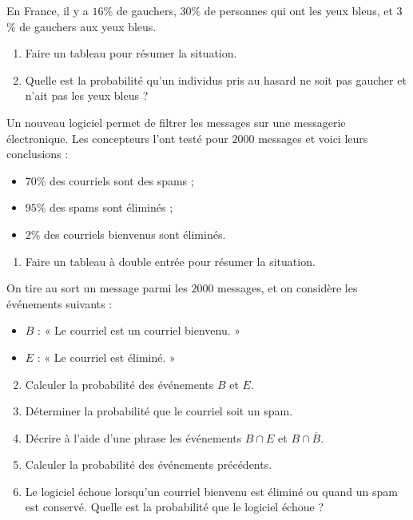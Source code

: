 \documentclass[11pt]{article}
\begin{document}
\begin{exo}
  En France, il y a $16$\% de gauchers, $30$\% de personnes qui ont les yeux
  bleus, et $3$\% de gauchers aux yeux bleus.
  \begin{enumerate}
    \item Faire un tableau pour résumer la situation.
    \item Quelle est la probabilité qu'un individus pris au hasard ne soit pas
      gaucher et n'ait pas les yeux bleus ?
  \end{enumerate}
\end{exo}

\begin{exo}
  Un nouveau logiciel permet de filtrer les messages sur une messagerie
  électronique. Les concepteurs l'ont testé pour $2000$ messages et voici leurs
  conclusions :
  \begin{itemize}
    \item $70$\% des courriels sont des spams ;
    \item $95$\% des spams sont éliminés ;
    \item $2$\% des courriels bienvenus sont éliminés.
  \end{itemize}
  \begin{enumerate}
    \item Faire un tableau à double entrée pour résumer la situation.
  \end{enumerate}
  On tire au sort un message parmi les $2000$ messages, et on considère les
  événements suivants :
  \begin{itemize}
    \item $B$ : « Le courriel est un courriel bienvenu. »
    \item $E$ : « Le courriel est éliminé. »
  \end{itemize}
  \begin{enumerate}
      \setcounter{enumi}{1}
    \item Calculer la probabilité des événements $B$ et $E$.
    \item Déterminer la probabilité que le courriel soit un spam.
    \item Décrire à l'aide d'une phrase les événements $B\cap E$ et
      $B\cap\overline B$.
    \item Calculer la probabilité des événements précédents.
    \item Le logiciel échoue lorsqu'un courriel bienvenu est éliminé ou quand un
      spam est conservé. Quelle est la probabilité que le logiciel échoue ?
  \end{enumerate}
\end{exo}
\end{document}
